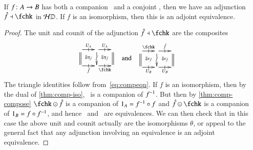 \begin{lem}\label{thm:compconj-adj}
  If $f\colon A\to B$ has both a companion \fhat\ and a conjoint \fchk,
  then we have an adjunction $\fhat\adj\fchk$ in $\mathcal{H}\mathbb{D}$.  If $f$ is
  an isomorphism, then this is an adjoint equivalence.
\end{lem}
\begin{proof}
  The unit and counit of the adjunction $\fhat\adj\fchk$ are the
  composites
  \[\vcenter{\xymatrix@-.5pc{
      \ar[r]|-@{|}^{U_A}\ar@{=}[d] \ar@{}[dr]|{\Downarrow \eta_{\hat{f}}} &
      \ar[r]|-@{|}^{U_A}\ar[d]|{f} \ar@{}[dr]|{\Downarrow \eta_{\check{f}}} &
      \ar@{=}[d]\\
      \ar[r]|-@{|}_{\fhat} &
      \ar[r]|-@{|}_{\fchk} &
    }}\quad\text{and}\quad
  \vcenter{\xymatrix@-.5pc{
      \ar[r]|-@{|}^{\fchk}\ar@{=}[d] \ar@{}[dr]|{\Downarrow \epsilon_{\check{f}}} &
      \ar[r]|-@{|}^{\fhat}\ar[d]|{f} \ar@{}[dr]|{\Downarrow \epsilon_{\hat{f}}} &
      \ar@{=}[d]\\
      \ar[r]|-@{|}_{U_B} &
      \ar[r]|-@{|}_{U_B} &
    }}
  \]
  The triangle identities follow from~\eqref{eq:compeqn}.  If $f$ is
  an isomorphism, then by the dual of \autoref{thm:comp-iso}, \fchk\
  is a companion of $f^{-1}$.  But then by \autoref{thm:comp-compose}
  $\fchk\odot \fhat$ is a companion of $1_A=f^{-1} \circ f$ and
  $\fhat\odot\fchk$ is a companion of $1_B = f\circ f^{-1}$, and hence
  \fhat\ and \fchk\ are equivalences.  We can then check that in this
  case the above unit and counit actually are the isomorphisms
  $\theta$, or appeal to the general fact that any adjunction
  involving an equivalence is an adjoint equivalence.
\end{proof}

